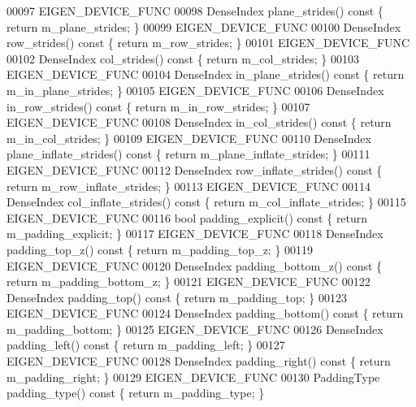 \begin{DoxyCode}
00097     EIGEN\_DEVICE\_FUNC
00098     DenseIndex plane\_strides()\textcolor{keyword}{ const }\{ \textcolor{keywordflow}{return} m\_plane\_strides; \}
00099     EIGEN\_DEVICE\_FUNC
00100     DenseIndex row\_strides()\textcolor{keyword}{ const }\{ \textcolor{keywordflow}{return} m\_row\_strides; \}
00101     EIGEN\_DEVICE\_FUNC
00102     DenseIndex col\_strides()\textcolor{keyword}{ const }\{ \textcolor{keywordflow}{return} m\_col\_strides; \}
00103     EIGEN\_DEVICE\_FUNC
00104     DenseIndex in\_plane\_strides()\textcolor{keyword}{ const }\{ \textcolor{keywordflow}{return} m\_in\_plane\_strides; \}
00105     EIGEN\_DEVICE\_FUNC
00106     DenseIndex in\_row\_strides()\textcolor{keyword}{ const }\{ \textcolor{keywordflow}{return} m\_in\_row\_strides; \}
00107     EIGEN\_DEVICE\_FUNC
00108     DenseIndex in\_col\_strides()\textcolor{keyword}{ const }\{ \textcolor{keywordflow}{return} m\_in\_col\_strides; \}
00109     EIGEN\_DEVICE\_FUNC
00110     DenseIndex plane\_inflate\_strides()\textcolor{keyword}{ const }\{ \textcolor{keywordflow}{return} m\_plane\_inflate\_strides; \}
00111     EIGEN\_DEVICE\_FUNC
00112     DenseIndex row\_inflate\_strides()\textcolor{keyword}{ const }\{ \textcolor{keywordflow}{return} m\_row\_inflate\_strides; \}
00113     EIGEN\_DEVICE\_FUNC
00114     DenseIndex col\_inflate\_strides()\textcolor{keyword}{ const }\{ \textcolor{keywordflow}{return} m\_col\_inflate\_strides; \}
00115     EIGEN\_DEVICE\_FUNC
00116     \textcolor{keywordtype}{bool} padding\_explicit()\textcolor{keyword}{ const }\{ \textcolor{keywordflow}{return} m\_padding\_explicit; \}
00117     EIGEN\_DEVICE\_FUNC
00118     DenseIndex padding\_top\_z()\textcolor{keyword}{ const }\{ \textcolor{keywordflow}{return} m\_padding\_top\_z; \}
00119     EIGEN\_DEVICE\_FUNC
00120     DenseIndex padding\_bottom\_z()\textcolor{keyword}{ const }\{ \textcolor{keywordflow}{return} m\_padding\_bottom\_z; \}
00121     EIGEN\_DEVICE\_FUNC
00122     DenseIndex padding\_top()\textcolor{keyword}{ const }\{ \textcolor{keywordflow}{return} m\_padding\_top; \}
00123     EIGEN\_DEVICE\_FUNC
00124     DenseIndex padding\_bottom()\textcolor{keyword}{ const }\{ \textcolor{keywordflow}{return} m\_padding\_bottom; \}
00125     EIGEN\_DEVICE\_FUNC
00126     DenseIndex padding\_left()\textcolor{keyword}{ const }\{ \textcolor{keywordflow}{return} m\_padding\_left; \}
00127     EIGEN\_DEVICE\_FUNC
00128     DenseIndex padding\_right()\textcolor{keyword}{ const }\{ \textcolor{keywordflow}{return} m\_padding\_right; \}
00129     EIGEN\_DEVICE\_FUNC
00130     PaddingType padding\_type()\textcolor{keyword}{ const }\{ \textcolor{keywordflow}{return} m\_padding\_type; \}

\end{DoxyCode}
